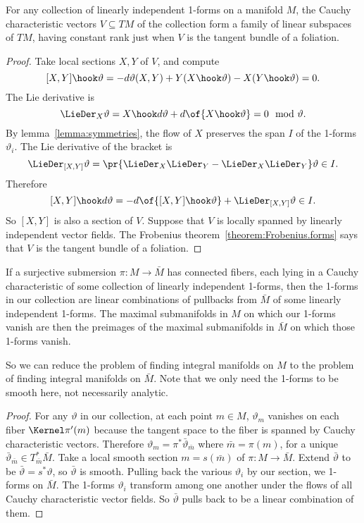 \begin{theorem}
For any collection of linearly independent 1-forms on a manifold \(M\), the Cauchy characteristic vectors \(V \subseteq TM\) of the collection form a family of linear subspaces of \(TM\), having constant rank just when \(V\) is the tangent bundle of a foliation.
\end{theorem}
\begin{proof}
Take local sections \(X,Y\) of \(V\), and compute
\[
[X,Y]\hook \vartheta=-d\vartheta(X,Y)+Y(X \hook \vartheta) - X(Y \hook \vartheta)=0.
\]
The Lie derivative is
\[
\LieDer_X \vartheta = X \hook d \vartheta + d\of{X \hook \vartheta}=0\mod{\vartheta}.
\]
By lemma~\ref{lemma:symmetries}, the flow of \(X\) preserves the span \(I\) of the 1-forms \(\vartheta_i\).
The Lie derivative of the bracket is
\[
\LieDer_{[X,Y]} \vartheta = \pr{\LieDer_X \LieDer_Y - \LieDer_X \LieDer_Y} \vartheta \in I.
\]
Therefore
\[
[X,Y] \hook d \vartheta=-d\of{[X,Y]\hook \vartheta} + \LieDer_{[X,Y]}\vartheta \in I.
\]
So \([X,Y]\) is also a section of \(V\).
Suppose that \(V\) is locally spanned by linearly independent vector fields.
The Frobenius theorem~\vref{theorem:Frobenius.forms} says that \(V\) is the tangent bundle of a foliation.
\end{proof}




\begin{theorem}
If a surjective submersion \(\pi \colon M \to \bar{M}\) has connected fibers, each lying in a Cauchy characteristic of some collection of linearly independent 1-forms, then the 1-forms in our collection are linear combinations of pullbacks from \(\bar{M}\) of some linearly independent 1-forms.
The maximal submanifolds in \(M\) on which our 1-forms vanish are then the preimages of the maximal submanifolds in \(\bar{M}\) on which those 1-forms vanish.
\end{theorem}
So we can reduce the problem of finding integral manifolds on \(M\) to the problem of finding integral manifolds on \(\bar{M}\).
Note that we only need the 1-forms to be smooth here, not necessarily analytic.
\begin{proof}
For any \(\vartheta\) in our collection, at each point \(m \in M\), \(\vartheta_m\) vanishes on each fiber \(\Kernel \pi'(m)\) because the tangent space to the fiber is spanned by Cauchy characteristic vectors.
Therefore \(\vartheta_m=\pi^*\bar\vartheta_{\bar{m}}\) where \(\bar{m}=\pi(m)\), for a unique \(\bar\vartheta_{\bar{m}} \in T^*_{\bar{m}} \bar{M}\).
Take a local smooth section \(m=s(\bar{m})\) of \(\pi \colon M \to \bar{M}\).
Extend \(\bar\vartheta\) to be \(\bar\vartheta=s^*\vartheta\), so  \(\bar\vartheta\) is smooth.
Pulling back the various \(\vartheta_i\) by our section, we 1-forms on \(\bar{M}\).
The 1-forms \(\vartheta_i\) transform among one another under the flows of all Cauchy characteristic vector fields.
So \(\bar\vartheta\) pulls back to be a linear combination of them.
\end{proof}


